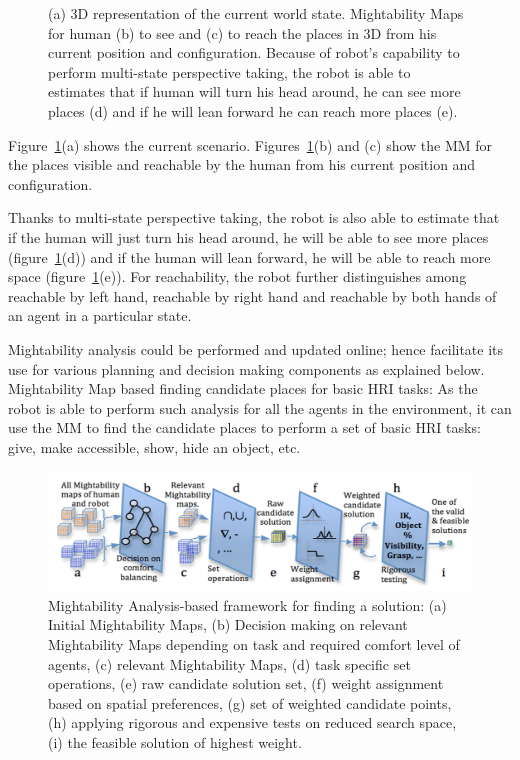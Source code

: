\documentclass{svmult}
\begin{document}
\begin{figure}[ht!]
   \caption{%
		(a) 3D representation of the current world state. Mightability Maps for
		human (b) to see and (c) to reach the places in 3D from his current
		position and configuration. Because of robot's capability to perform
		multi-state perspective taking, the robot is able to estimates that if
		human will turn his head around, he can see more places (d) and if he
		will lean forward he can reach more places (e).
   }
		
   \label{fig|mightabilities}
\end{figure}

Figure~\ref{fig|mightabilities}(a) shows the current scenario.
Figures~\ref{fig|mightabilities}(b) and (c) show the MM for the places visible
and reachable by the human from his current position and configuration.

Thanks to multi-state perspective taking, the robot is also able to estimate
that if the human will just turn his head around, he will be able to see more
places (figure~\ref{fig|mightabilities}(d)) and if the human will lean forward,
he will be able to reach more space (figure~\ref{fig|mightabilities}(e)). For
reachability, the robot further distinguishes among reachable by left hand,
reachable by right hand and reachable by both hands of an agent in a particular
state.  

Mightability analysis could be performed and updated online; hence facilitate
its use for various planning and decision making components as explained below.
Mightability Map based finding candidate places for basic HRI
tasks: As the robot is able to perform such
analysis for all the agents in the environment, it can use the MM to find the
candidate places to perform a set of basic HRI tasks: give, make accessible,
show, hide an object, etc. 

\begin{figure}
  \centering
  \includegraphics[width=\textwidth]{./figs/mightabilities/3.png}

\caption { Mightability Analysis-based framework for finding a solution: (a)
Initial Mightability Maps, (b) Decision making on relevant Mightability Maps
depending on task and required comfort level of agents, (c) relevant
Mightability Maps, (d) task specific set operations, (e) raw candidate solution
set, (f) weight assignment based on spatial preferences, (g) set of weighted
candidate points, (h) applying rigorous and expensive tests on reduced search
space, (i) the feasible solution of highest weight.}

  \label{fig|mightabilities-framework}
\end{figure}
\end{document}
